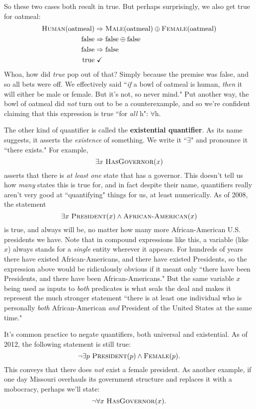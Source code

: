 So these two cases both result in true. But perhaps surprisingly, we also
get true for oatmeal:
\begin{align*}
\textsc{Human}(\text{oatmeal}) & \Rightarrow \textsc{Male}(\text{oatmeal}) \oplus \textsc{Female}(\text{oatmeal}) \\
\text{false} & \Rightarrow \text{false} \oplus \text{false} \\
\text{false} & \Rightarrow \text{false} \\
\text{true} & \ \checkmark
\end{align*}
Whoa, how did \textit{true} pop out of that? Simply because the premise was
false, and so all bets were off. We effectively said ``\textit{if} a bowl
of oatmeal is human, \textit{then} it will either be male or female. But
it's not, so never mind." Put another way, the bowl of oatmeal did
\textit{not} turn out to be a counterexample, and so we're confident
claiming that this expression is true ``for \textit{all} h": $\forall$h.

The other kind of quantifier is called the \textbf{existential quantifier}.
As its name suggests, it asserts the \textit{existence} of something. We
write it ``$\exists$" and pronounce it ``there exists." For example,
\[
\exists x\ \textsc{HasGovernor}(x)
\]
asserts that there is \textit{at least one} state that has a governor. This
doesn't tell us how \textit{many} states this is true for, and in fact
despite their name, quantifiers really aren't very good at ``quantifying"
things for us, at least numerically. As of 2008, the statement
\[
\exists x\ \textsc{President}(x) \wedge \textsc{African-American}(x)
\]
is true, and always will be, no matter how many more African-American U.S.
presidents we have. Note that in compound expressions like this, a variable
(like $x$) always stands for a \textit{single} entity wherever it appears.
For hundreds of years there have existed African-Americans, and there have
existed Presidents, so the expression above would be ridiculously obvious
if it meant only ``there have been Presidents, and there have been
African-Americans." But the same variable $x$ being used as inputs to
\textit{both} predicates is what seals the deal and makes it represent the
much stronger statement ``there is at least one individual who is
personally \textit{both} African-American \textit{and} President of the
United States at the same time."

It's common practice to negate quantifiers, both universal and existential. 
As of 2012, the following statement is still true:
\[
\neg \exists p\ \textsc{President}(p) \wedge \textsc{Female}(p).
\]
This conveys that there does \textit{not} exist a female president. As
another example, if one day Missouri overhauls its government structure and
replaces it with a mobocracy, perhaps we'll state:
\[
\neg \forall x\ \textsc{HasGovernor}(x).
\]


